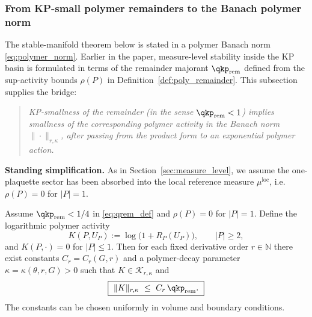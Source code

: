 \subsubsection{From KP-small polymer remainders to the Banach polymer norm}
\label{subsec:kp_to_banach_polymer}

The stable-manifold theorem below is stated in a polymer Banach norm \eqref{eq:polymer_norm}.
Earlier in the paper, measure-level stability inside the KP basin is formulated in terms of the remainder majorant
$\qkp_{\mathrm{rem}}$ defined from the sup-activity bounds $\rho(P)$ in
Definition~\ref{def:poly_remainder}.
This subsection supplies the bridge:
\begin{quote}
\emph{KP-smallness of the remainder (in the sense $\qkp_{\mathrm{rem}}<1$) implies smallness of the corresponding polymer activity in the
Banach norm $\|\cdot\|_{r,\kappa}$, after passing from the product form to an exponential polymer action.}
\end{quote}

\medskip
\noindent
\textbf{Standing simplification.}
As in Section~\ref{sec:measure_level}, we assume the one-plaquette sector has been absorbed into the local reference measure
$\mu^{\mathrm{loc}}$, i.e. $\rho(P)=0$ for $|P|=1$.

\begin{lemma}
\label{lem:qrem_to_banach}
Assume $\qkp_{\mathrm{rem}}<1/4$ in \eqref{eq:qrem_def} and $\rho(P)=0$ for $|P|=1$.
Define the logarithmic polymer activity
\begin{equation}\label{eq:K_from_R}
K(P,U_P):=\log\bigl(1+R_P(U_P)\bigr),\qquad |P|\ge 2,
\end{equation}
and $K(P,\cdot)=0$ for $|P|\le 1$.
Then for each fixed derivative order $r\in\mathbb N$ there exist constants
\(C_r=C_r(G,r)\) and a polymer-decay parameter $\kappa=\kappa(\theta,r,G)>0$ such that $K\in\mathcal K_{r,\kappa}$ and
\begin{equation}\label{eq:Knorm_from_qrem}
\boxed{\ \|K\|_{r,\kappa}\ \le\ C_r\,\qkp_{\mathrm{rem}}.\ }
\end{equation}
The constants can be chosen uniformly in volume and boundary conditions.
\end{lemma}


